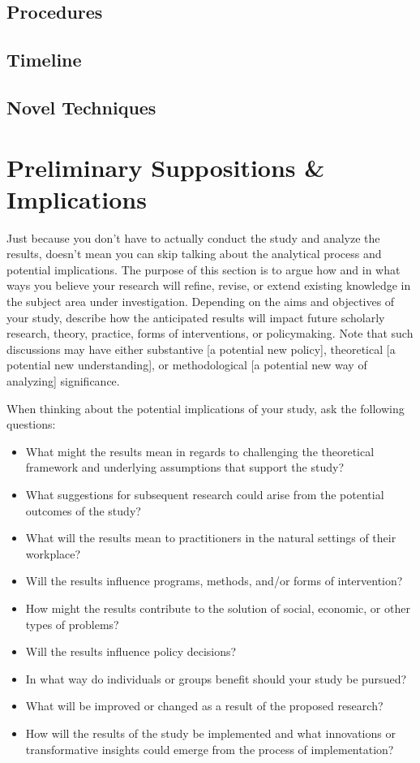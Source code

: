 \documentclass[10pt,twocolumn,letterpaper]{article}
\begin{document}
\subsection{Procedures}
\subsection{Timeline}
\subsection{Novel Techniques}

\section{Preliminary Suppositions \& Implications}
Just because you don't have to actually conduct the study and analyze the results, doesn't mean you can skip talking about the analytical process and potential implications. The purpose of this section is to argue how and in what ways you believe your research will refine, revise, or extend existing knowledge in the subject area under investigation. Depending on the aims and objectives of your study, describe how the anticipated results will impact future scholarly research, theory, practice, forms of interventions, or policymaking. Note that such discussions may have either substantive [a potential new policy], theoretical [a potential new understanding], or methodological [a potential new way of analyzing] significance.
 
When thinking about the potential implications of your study, ask the following questions:
\begin{itemize}
    \item What might the results mean in regards to challenging the theoretical framework and underlying assumptions that support the study?
    \item What suggestions for subsequent research could arise from the potential outcomes of the study?
    \item What will the results mean to practitioners in the natural settings of their workplace?
    \item Will the results influence programs, methods, and/or forms of intervention?
    \item How might the results contribute to the solution of social, economic, or other types of problems?
    \item Will the results influence policy decisions?
    \item In what way do individuals or groups benefit should your study be pursued?
    \item What will be improved or changed as a result of the proposed research?
    \item How will the results of the study be implemented and what innovations or transformative insights could emerge from the process of implementation?
\end{itemize}
\end{document}
